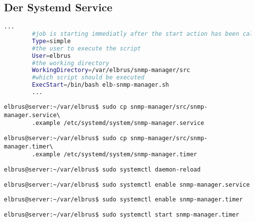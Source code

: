 \documentclass{article}
\begin{document}
	\newpage
	\subsection[systemd service]{Der Systemd Service}
	\lstset{style=files}
	\begin{lstlisting}[caption={snmp-manager.service.example - Die Variable 'WorkingDirectory' sowie die Variable 'User' anpassen.},language=bash ,keywords={WorkingDirectory, User}, keywordstyle=\color{red}, firstnumber=5]
		...
		#job is starting immediatly after the start action has been called
		Type=simple
		#the user to execute the script
		User=elbrus
		#the working directory
		WorkingDirectory=/var/elbrus/snmp-manager/src
		#which script should be executed
		ExecStart=/bin/bash elb-snmp-manager.sh
		...
	\end{lstlisting}
	\lstset{style=commands}
	\begin{lstlisting}[caption={Kopieren des Serviceprogrammes.}]
		elbrus@server:~/var/elbrus$ sudo cp snmp-manager/src/snmp-manager.service\
		.example /etc/systemd/system/snmp-manager.service
	\end{lstlisting}
	
	\begin{lstlisting}[caption={Kopieren des Zeitplanungsprogrammes.}]
		elbrus@server:~/var/elbrus$ sudo cp snmp-manager/src/snmp-manager.timer\
		.example /etc/systemd/system/snmp-manager.timer
	\end{lstlisting}
	
	\begin{lstlisting}[caption={Neuladen des 'systemctl' Deamons.}]
		elbrus@server:~/var/elbrus$ sudo systemctl daemon-reload
	\end{lstlisting}
	
	\begin{lstlisting}[caption={Aktivieren des Serviceprogrammes.}]
		elbrus@server:~/var/elbrus$ sudo systemctl enable snmp-manager.service
	\end{lstlisting}
	
	\begin{lstlisting}[caption={Aktivieren des Zeitplanungsprogrammes.}]
		elbrus@server:~/var/elbrus$ sudo systemctl enable snmp-manager.timer
	\end{lstlisting}
	
	\begin{lstlisting}[caption={Starten des Zeitplanungsprogrammes.}]
		elbrus@server:~/var/elbrus$ sudo systemctl start snmp-manager.timer
	\end{lstlisting}
	\newpage
	
\end{document}
